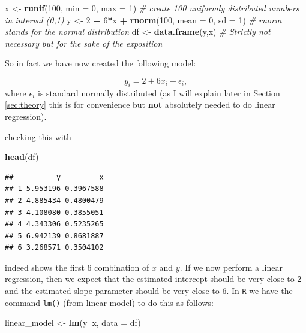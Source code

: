 \documentclass[]{article}
\newenvironment{Shaded}{\begin{snugshade}}{\end{snugshade}}
\newcommand{\KeywordTok}[1]{\textcolor[rgb]{0.13,0.29,0.53}{\textbf{#1}}}
\newcommand{\DataTypeTok}[1]{\textcolor[rgb]{0.13,0.29,0.53}{#1}}
\newcommand{\DecValTok}[1]{\textcolor[rgb]{0.00,0.00,0.81}{#1}}
\newcommand{\StringTok}[1]{\textcolor[rgb]{0.31,0.60,0.02}{#1}}
\newcommand{\CommentTok}[1]{\textcolor[rgb]{0.56,0.35,0.01}{\textit{#1}}}
\newcommand{\OperatorTok}[1]{\textcolor[rgb]{0.81,0.36,0.00}{\textbf{#1}}}
\newcommand{\NormalTok}[1]{#1}
\theoremstyle{definition}
\theoremstyle{definition}
\theoremstyle{definition}
\theoremstyle{remark}
\begin{document}
\begin{Shaded}
\begin{Highlighting}[]
\NormalTok{x <-}\StringTok{ }\KeywordTok{runif}\NormalTok{(}\DecValTok{100}\NormalTok{, }\DataTypeTok{min =} \DecValTok{0}\NormalTok{, }\DataTypeTok{max =} \DecValTok{1}\NormalTok{) }\CommentTok{# create 100 uniformly distributed numbers in interval (0,1)}
\NormalTok{y <-}\StringTok{ }\DecValTok{2} \OperatorTok{+}\StringTok{ }\DecValTok{6}\OperatorTok{*}\NormalTok{x }\OperatorTok{+}\StringTok{ }\KeywordTok{rnorm}\NormalTok{(}\DecValTok{100}\NormalTok{, }\DataTypeTok{mean =} \DecValTok{0}\NormalTok{, }\DataTypeTok{sd =} \DecValTok{1}\NormalTok{) }\CommentTok{# rnorm stands for the normal distribution}
\NormalTok{df <-}\StringTok{ }\KeywordTok{data.frame}\NormalTok{(y,x) }\CommentTok{# Strictly not necessary but for the sake of the exposition}
\end{Highlighting}
\end{Shaded}

So in fact we have now created the following model:

\[
y_i = 2 + 6 x_i + \epsilon_i,
\] where \(\epsilon_i\) is standard normally distributed (as I will
explain later in Section \ref{sec:theory} this is for convenience but
\textbf{not} absolutely needed to do linear regression).

checking this with

\begin{Shaded}
\begin{Highlighting}[]
\KeywordTok{head}\NormalTok{(df)}
\end{Highlighting}
\end{Shaded}

\begin{verbatim}
##          y         x
## 1 5.953196 0.3967588
## 2 4.885434 0.4800479
## 3 4.108080 0.3855051
## 4 4.343306 0.5235265
## 5 6.942139 0.8681887
## 6 3.268571 0.3504102
\end{verbatim}

indeed shows the first 6 combination of \(x\) and \(y\). If we now
perform a linear regression, then we expect that the estimated intercept
should be very close to 2 and the estimated slope parameter should be
very close to 6. In \texttt{R} we have the command \texttt{lm()} (from
linear model) to do this as follows:

\begin{Shaded}
\begin{Highlighting}[]
\NormalTok{linear_model <-}\StringTok{ }\KeywordTok{lm}\NormalTok{(y}\OperatorTok{~}\NormalTok{x, }\DataTypeTok{data =}\NormalTok{ df)}
\end{Highlighting}
\end{Shaded}
\end{document}
